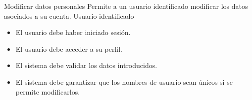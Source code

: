 \documentclass[a4paper,11pt]{article}
\newlength{\cduAlto}
\newlength{\cduBajo}
\newlength{\cduAnchoCorto}
\newcommand{\cduAltura}[1]{%
  \setlength{\cduAlto}{#1}%
  \setlength{\cduBajo}{0.35\cduAlto}%
  \rule[-\cduBajo]{0pt}{\cduAlto}%
}
\newcommand{\cduEtiqueta}[1]{{\sffamily\bfseries #1}}
\newcommand{\cduDiagrama}[2][5.4cm]{%
  \noindent
  \begin{tabularx}{\textwidth}{|>{\centering\arraybackslash}X|}
    \hline
    \vspace{0.15cm}#2\vspace{0.15cm} \\
    \hline
  \end{tabularx}%
  \par\nointerlineskip%
}
\newcommand{\cduCampoAncho}[3]{%
  \noindent
  \begin{tabularx}{\textwidth}{|L{#1}|Y|}
    \hline
    \cduAltura{0.70cm}\cduEtiqueta{#2} & #3 \\
    \hline
  \end{tabularx}%
  \par\nointerlineskip%
}
\newcommand{\cduBloque}[3][0.85cm]{%
  \noindent
  \begin{tabularx}{\textwidth}{|>{\raggedright\arraybackslash}X|}
    \hline
    \cduEtiqueta{#2}\par
    \vspace{0.15cm}%
    \begin{minipage}{\linewidth}
      \centering
      #3
    \end{minipage}%
    \par\vspace{0.15cm}%
    \cduAltura{#1} \\
    \hline
  \end{tabularx}%
  \par\nointerlineskip%
}
\newcommand{\casoDeUso}[9]{%
    \begingroup
    \linespread{0.78}\selectfont

    \refstepcounter{subsubsection}%
    \phantomsection
    \addcontentsline{toc}{subsubsection}{%
    \protect\numberline{\thesubsubsection}#2}

    \cduDiagrama[5.4cm]{#1}

    \cduCampoAncho{\cduAnchoCorto}{Nombre:}{#2}
    \cduCampoAncho{\cduAnchoCorto}{Descripción:}{#3}
    \cduCampoAncho{\cduAnchoCorto}{Actores:}{#4}
    \cduCampoAncho{\cduAnchoCorto}{Precondiciones:}{#5}
    \cduCampoAncho{\cduAnchoCorto}{Requisitos no funcionales:}{#6}
    \cduCampoAncho{\cduAnchoCorto}{Flujo de eventos:}{#7}
    \cduCampoAncho{\cduAnchoCorto}{Poscondiciones:}{#8}
    \cduBloque[0.9cm]{Interfaz Gráfica:}{#9}

    \endgroup
}
\begin{document}

\clearpage

\casoDeUso{\cduGraficoFuncUno}
  {Modificar datos personales}
  {Permite a un usuario identificado modificar los datos asociados a su cuenta.}
  {Usuario identificado}
  {\begin{itemize}
    \item El usuario debe haber iniciado sesión.
    \item El usuario debe acceder a su perfil.
  \end{itemize}}
  {\begin{itemize}
    \item El sistema debe validar los datos introducidos.
    \item El sistema debe garantizar que los nombres de usuario sean únicos si se permite modificarlos.
  \end{itemize}}
\end{document}
